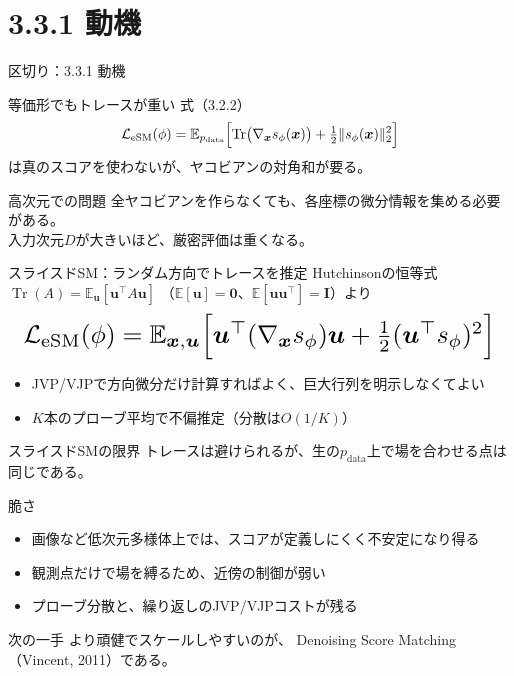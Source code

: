 \section{3.3.1 動機}
\asmain
\begin{frame}{区切り：3.3.1 動機}
    \tableofcontents[currentsection]
\end{frame}
\asmain
\begin{frame}{等価形でもトレースが重い}
    式（3.2.2）
    \[
        \mathcal{L}_{\mathrm{eSM}}(\phi)
        =
        \mathbb{E}_{p_{\mathrm{data}}}
        \Bigl[
        \operatorname{Tr}\bigl(\nabla_{\bm{x}}s_\phi(\bm{x})\bigr)
        +
        \tfrac12\|s_\phi(\bm{x})\|_2^2
        \Bigr]
    \]
    は真のスコアを使わないが、ヤコビアンの対角和が要る。
    \begin{block}{高次元での問題}
        全ヤコビアンを作らなくても、各座標の微分情報を集める必要がある。\\
        入力次元$D$が大きいほど、厳密評価は重くなる。
    \end{block}
\end{frame}
\asmain
\begin{frame}{スライスドSM：ランダム方向でトレースを推定}
    Hutchinsonの恒等式
    $\operatorname{Tr}(A)=\mathbb{E}_{\bm{u}}[\bm{u}^{\top}A\bm{u}]$
    （$\mathbb{E}[\bm{u}]=\bm{0}$、$\mathbb{E}[\bm{u}\bm{u}^{\top}]=\bm{I}$）より
    \[
        \resizebox{0.98\textwidth}{!}{$
        \mathcal{L}_{\mathrm{eSM}}(\phi)
        =
        \mathbb{E}_{\bm{x},\bm{u}}
        \Bigl[
        \bm{u}^{\top}(\nabla_{\bm{x}}s_\phi)\bm{u}
        +
        \tfrac12(\bm{u}^{\top}s_\phi)^{2}
        \Bigr]
        $}
    \]
    \begin{itemize}
        \item JVP/VJPで方向微分だけ計算すればよく、巨大行列を明示しなくてよい
        \item $K$本のプローブ平均で不偏推定（分散は$O(1/K)$）
    \end{itemize}
\end{frame}
\assuppl
\begin{frame}{スライスドSMの限界}
    トレースは避けられるが、生の$p_{\mathrm{data}}$上で場を合わせる点は同じである。
    \begin{exampleblock}{脆さ}
        \begin{itemize}
            \item 画像など低次元多様体上では、スコアが定義しにくく不安定になり得る
            \item 観測点だけで場を縛るため、近傍の制御が弱い
            \item プローブ分散と、繰り返しのJVP/VJPコストが残る
        \end{itemize}
    \end{exampleblock}
    \begin{exampleblock}{次の一手}
        より頑健でスケールしやすいのが、
        Denoising Score Matching（Vincent, 2011）である。
    \end{exampleblock}
\end{frame}
